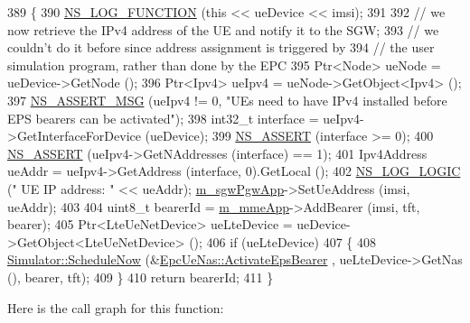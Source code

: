 \begin{DoxyCode}
389 \{
390   \hyperlink{log-macros-disabled_8h_a90b90d5bad1f39cb1b64923ea94c0761}{NS\_LOG\_FUNCTION} (\textcolor{keyword}{this} << ueDevice << imsi);
391 
392   \textcolor{comment}{// we now retrieve the IPv4 address of the UE and notify it to the SGW;}
393   \textcolor{comment}{// we couldn't do it before since address assignment is triggered by}
394   \textcolor{comment}{// the user simulation program, rather than done by the EPC   }
395   Ptr<Node> ueNode = ueDevice->GetNode (); 
396   Ptr<Ipv4> ueIpv4 = ueNode->GetObject<Ipv4> ();
397   \hyperlink{assert_8h_aff5ece9066c74e681e74999856f08539}{NS\_ASSERT\_MSG} (ueIpv4 != 0, \textcolor{stringliteral}{"UEs need to have IPv4 installed before EPS bearers can be
       activated"});
398   int32\_t \textcolor{keyword}{interface }=  ueIpv4->GetInterfaceForDevice (ueDevice);
399   \hyperlink{assert_8h_a6dccdb0de9b252f60088ce281c49d052}{NS\_ASSERT} (interface >= 0);
400   \hyperlink{assert_8h_a6dccdb0de9b252f60088ce281c49d052}{NS\_ASSERT} (ueIpv4->GetNAddresses (interface) == 1);
401   Ipv4Address ueAddr = ueIpv4->GetAddress (interface, 0).GetLocal ();
402   \hyperlink{group__logging_ga88acd260151caf2db9c0fc84997f45ce}{NS\_LOG\_LOGIC} (\textcolor{stringliteral}{" UE IP address: "} << ueAddr);  \hyperlink{classns3_1_1EmuEpcHelper_a9f3619ec9e8725d4fbb9794a4f21aaa4}{m\_sgwPgwApp}->SetUeAddress (imsi, 
      ueAddr);
403   
404   uint8\_t bearerId = \hyperlink{classns3_1_1EmuEpcHelper_a20264a8bd8b295161b08d09e4794f02f}{m\_mmeApp}->AddBearer (imsi, tft, bearer);
405   Ptr<LteUeNetDevice> ueLteDevice = ueDevice->GetObject<LteUeNetDevice> ();
406   \textcolor{keywordflow}{if} (ueLteDevice)
407     \{
408       \hyperlink{classns3_1_1Simulator_a2219ee02c0647adc83d1c918c3256266}{Simulator::ScheduleNow} (&\hyperlink{classns3_1_1EpcUeNas_acf5ffebf27befd60a0984e8284556b92}{EpcUeNas::ActivateEpsBearer}
      , ueLteDevice->GetNas (), bearer, tft);
409     \}
410   \textcolor{keywordflow}{return} bearerId;
411 \}
\end{DoxyCode}


Here is the call graph for this function\+:


